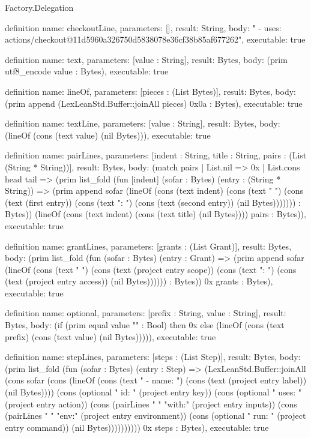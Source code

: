 \begin{lexlean}{Factory.Delegation}
\begin{semanticmodule}
definition{
  name: checkoutLine,
  parameters: [],
  result: String,
  body: "      - uses: actions/checkout@11d5960a326750d5838078e36cf38b85af677262",
  executable: true
}

definition{
  name: text,
  parameters: [value : String],
  result: Bytes,
  body: (prim utf8_encode value : Bytes),
  executable: true
}

definition{
  name: lineOf,
  parameters: [pieces : (List Bytes)],
  result: Bytes,
  body: (prim append (LexLeanStd.Buffer::joinAll pieces) 0x0a : Bytes),
  executable: true
}

definition{
  name: textLine,
  parameters: [value : String],
  result: Bytes,
  body: (lineOf (cons (text value) (nil Bytes))),
  executable: true
}

definition{
  name: pairLines,
  parameters: [indent : String, title : String, pairs : (List (String * String))],
  result: Bytes,
  body: (match pairs
      | List.nil => 0x
      | List.cons head tail => (prim list_fold (fun [indent] (sofar : Bytes) (entry : (String * String)) => (prim append sofar (lineOf (cons (text indent) (cons (text "  ") (cons (text (first entry)) (cons (text ": ") (cons (text (second entry)) (nil Bytes))))))) : Bytes)) (lineOf (cons (text indent) (cons (text title) (nil Bytes)))) pairs : Bytes)),
  executable: true
}

definition{
  name: grantLines,
  parameters: [grants : (List Grant)],
  result: Bytes,
  body: (prim list_fold (fun (sofar : Bytes) (entry : Grant) => (prim append sofar (lineOf (cons (text "      ") (cons (text (project entry scope)) (cons (text ": ") (cons (text (project entry access)) (nil Bytes)))))) : Bytes)) 0x grants : Bytes),
  executable: true
}

definition{
  name: optional,
  parameters: [prefix : String, value : String],
  result: Bytes,
  body: (if (prim equal value "" : Bool) then 0x else (lineOf (cons (text prefix) (cons (text value) (nil Bytes))))),
  executable: true
}

definition{
  name: stepLines,
  parameters: [steps : (List Step)],
  result: Bytes,
  body: (prim list_fold (fun (sofar : Bytes) (entry : Step) => (LexLeanStd.Buffer::joinAll (cons sofar (cons (lineOf (cons (text "      - name: ") (cons (text (project entry label)) (nil Bytes)))) (cons (optional "        id: " (project entry key)) (cons (optional "        uses: " (project entry action)) (cons (pairLines "        " "with:" (project entry inputs)) (cons (pairLines "        " "env:" (project entry environment)) (cons (optional "        run: " (project entry command)) (nil Bytes)))))))))) 0x steps : Bytes),
  executable: true
}


\end{semanticmodule}
\end{lexlean}
